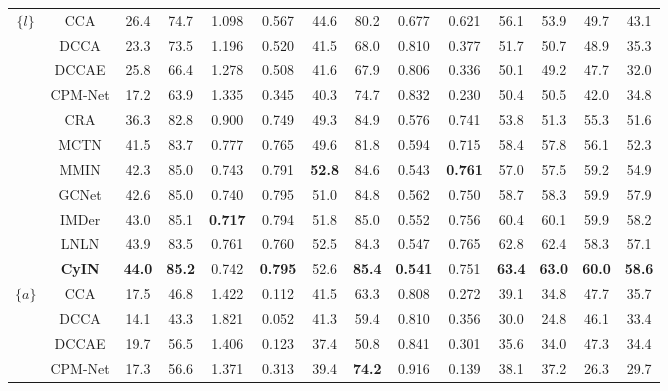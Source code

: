 \documentclass{article}
\begin{document}
\begin{table}[htbp]
{\begin{tabular}{cccccccccccccc}
    \midrule[0.5pt]
     \multirow{11}{*}{$\{l\}$} ~ & CCA & 26.4  & 74.7  & 1.098  & 0.567  & 44.6  & 80.2  & 0.677  & 0.621  & 56.1  & 53.9  & 49.7  & 43.1  \\ 
        ~ & DCCA & 23.3  & 73.5  & 1.196  & 0.520  & 41.5  & 68.0  & 0.810  & 0.377  & 51.7  & 50.7  & 48.9  & 35.3  \\ 
        ~ & DCCAE & 25.8  & 66.4  & 1.278  & 0.508  & 41.6  & 67.9  & 0.806  & 0.336  & 50.1  & 49.2  & 47.7  & 32.0  \\ 
        ~ & CPM-Net & 17.2  & 63.9  & 1.335  & 0.345  & 40.3  & 74.7  & 0.832  & 0.230  & 50.4  & 50.5  & 42.0  & 34.8  \\ 
        ~ & CRA & 36.3  & 82.8  & 0.900  & 0.749  & 49.3  & 84.9  & 0.576  & 0.741  & 53.8  & 51.3  & 55.3  & 51.6  \\ 
        ~ & MCTN & 41.5  & 83.7  & 0.777  & 0.765  & 49.6  & 81.8  & 0.594  & 0.715  & 58.4  & 57.8  & 56.1  & 52.3  \\ 
        ~ & MMIN & 42.3  & 85.0  & 0.743  & 0.791  & \textbf{52.8}  & 84.6  & 0.543  & \textbf{0.761}  & 57.0  & 57.5  & 59.2  & 54.9 \\ 
        ~ & GCNet & 42.6  & 85.0  & 0.740  & 0.795  & 51.0  & 84.8  & 0.562  & 0.750  & 58.7  & 58.3  & 59.9  & 57.9  \\ 
        ~ & IMDer & 43.0  & 85.1  & \textbf{0.717}  & 0.794  & 51.8  & 85.0  & 0.552  & 0.756  & 60.4  & 60.1  & 59.9  & 58.2  \\ 
        ~ & LNLN & 43.9  & 83.5  & 0.761  & 0.760  & 52.5  & 84.3  & 0.547  & 0.765  & 62.8  & 62.4  & 58.3  & 57.1  \\ 
        ~ & \textbf{CyIN} & \textbf{44.0} & \textbf{85.2} & 0.742 & \textbf{0.795} & 52.6 & \textbf{85.4} & \textbf{0.541} & 0.751 & \textbf{63.4} & \textbf{63.0} & \textbf{60.0} & \textbf{58.6} \\ 
    \midrule[0.5pt]
    \multirow{11}{*}{$\{a\}$} ~ & CCA & 17.5  & 46.8  & 1.422  & 0.112  & 41.5  & 63.3  & 0.808  & 0.272  & 39.1  & 34.8  & 47.7  & 35.7  \\ 
        ~ & DCCA & 14.1  & 43.3  & 1.821  & 0.052  & 41.3  & 59.4  & 0.810  & 0.356  & 30.0  & 24.8  & 46.1  & 33.4  \\ 
        ~ & DCCAE & 19.7  & 56.5  & 1.406  & 0.123  & 37.4  & 50.8  & 0.841  & 0.301  & 35.6  & 34.0  & 47.3  & 34.4  \\ 
        ~ & CPM-Net & 17.3  & 56.6  & 1.371  & 0.313  & 39.4  & \textbf{74.2}  & 0.916  & 0.139  & 38.1  & 37.2  & 26.3  & 29.7  \\ 

\end{tabular}}
\end{table}
\end{document}
